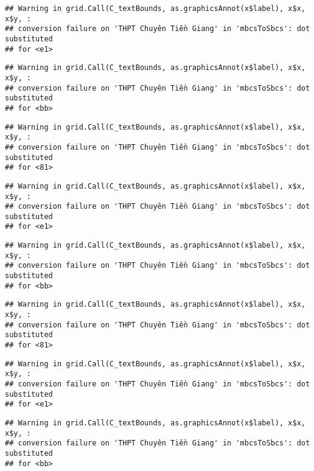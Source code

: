 \documentclass[
]{article}
\begin{document}
\begin{verbatim}
## Warning in grid.Call(C_textBounds, as.graphicsAnnot(x$label), x$x, x$y, :
## conversion failure on 'THPT Chuyên Tiền Giang' in 'mbcsToSbcs': dot substituted
## for <e1>
\end{verbatim}

\begin{verbatim}
## Warning in grid.Call(C_textBounds, as.graphicsAnnot(x$label), x$x, x$y, :
## conversion failure on 'THPT Chuyên Tiền Giang' in 'mbcsToSbcs': dot substituted
## for <bb>
\end{verbatim}

\begin{verbatim}
## Warning in grid.Call(C_textBounds, as.graphicsAnnot(x$label), x$x, x$y, :
## conversion failure on 'THPT Chuyên Tiền Giang' in 'mbcsToSbcs': dot substituted
## for <81>
\end{verbatim}

\begin{verbatim}
## Warning in grid.Call(C_textBounds, as.graphicsAnnot(x$label), x$x, x$y, :
## conversion failure on 'THPT Chuyên Tiền Giang' in 'mbcsToSbcs': dot substituted
## for <e1>
\end{verbatim}

\begin{verbatim}
## Warning in grid.Call(C_textBounds, as.graphicsAnnot(x$label), x$x, x$y, :
## conversion failure on 'THPT Chuyên Tiền Giang' in 'mbcsToSbcs': dot substituted
## for <bb>
\end{verbatim}

\begin{verbatim}
## Warning in grid.Call(C_textBounds, as.graphicsAnnot(x$label), x$x, x$y, :
## conversion failure on 'THPT Chuyên Tiền Giang' in 'mbcsToSbcs': dot substituted
## for <81>
\end{verbatim}

\begin{verbatim}
## Warning in grid.Call(C_textBounds, as.graphicsAnnot(x$label), x$x, x$y, :
## conversion failure on 'THPT Chuyên Tiền Giang' in 'mbcsToSbcs': dot substituted
## for <e1>
\end{verbatim}

\begin{verbatim}
## Warning in grid.Call(C_textBounds, as.graphicsAnnot(x$label), x$x, x$y, :
## conversion failure on 'THPT Chuyên Tiền Giang' in 'mbcsToSbcs': dot substituted
## for <bb>
\end{verbatim}
\end{document}

